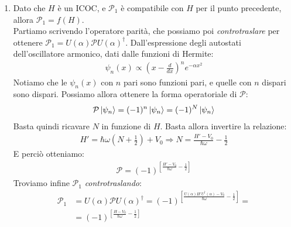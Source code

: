 \documentclass[../../FisicaTeorica.tex]{subfiles}
\begin{document}
\begin{enumerate}
\item Dato che $H$ è un ICOC, e $\mathcal{P}_1$ è compatibile con $H$ per il punto precedente, allora $\mathcal{P}_1 = f(H)$.\\
Partiamo scrivendo l'operatore parità, che possiamo poi \textit{controtraslare} per ottenere $\mathcal{P}_1 = U(\alpha)\mathcal{P}U(\alpha)^\dag$. Dall'espressione degli autostati dell'oscillatore armonico, dati dalle funzioni di Hermite:
\begin{align*}
\psi_n(x) \propto \left( x- \frac{d}{dx}\right)^{n} e^{-\alpha x^2}
\end{align*}
Notiamo che le $\psi_n(x)$ con $n$ pari sono funzioni pari, e quelle con $n$ dispari sono dispari. Possiamo allora ottenere la forma operatoriale di $\mathcal{P}$:
\begin{align*}
\mathcal{P}\Ket{\psi_n} = (-1)^n \Ket{\psi_n} = (-1)^N \Ket{\psi_n}
\end{align*}
Basta quindi ricavare $N$ in funzione di $H$. Basta allora invertire la relazione:
\begin{align*}
H' = \hbar \omega\left(N+\frac{1}{2}\right) + V_0 \Rightarrow  N = \frac{H'-V_0}{\hbar \omega}-\frac{1}{2}
\end{align*}
E perciò otteniamo:
\begin{align*}
\mathcal{P} = (-1)^{\displaystyle\left[ \frac{H'-V_0}{\hbar \omega}-\frac{1}{2}\right]}
\end{align*}
Troviamo infine $\mathcal{P}_1$ \textit{controtraslando}:
\begin{align*}
\mathcal{P}_1 &= U(\alpha)\mathcal{P}U(\alpha)^\dag = (-1)^{\displaystyle\left[\frac{U(\alpha)H' U^\dag(\alpha) - V_0}{\hbar \omega}-\frac{1}{2} \right]} = \\
&=(-1)^{\displaystyle\left[\frac{H-V_0}{\hbar \omega}-\frac{1}{2} \right ]}
\end{align*}
\end{enumerate}
\end{document}

